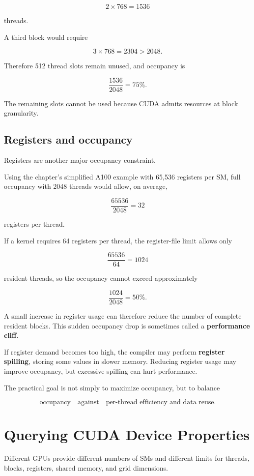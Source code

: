 \documentclass[11pt,a4paper]{article}
\begin{document}
\[
2\times768=1536
\]

threads.

A third block would require

\[
3\times768=2304>2048.
\]

Therefore 512 thread slots remain unused, and occupancy is

\[
\frac{1536}{2048}=75\%.
\]

The remaining slots cannot be used because CUDA admits resources at block granularity.

\subsection{Registers and occupancy}

Registers are another major occupancy constraint.

Using the chapter's simplified A100 example with 65,536 registers per SM, full occupancy with 2048 threads would allow, on average,

\[
\frac{65536}{2048}
=
32
\]

registers per thread.

If a kernel requires 64 registers per thread, the register-file limit allows only

\[
\frac{65536}{64}
=
1024
\]

resident threads, so the occupancy cannot exceed approximately

\[
\frac{1024}{2048}
=
50\%.
\]

A small increase in register usage can therefore reduce the number of complete resident blocks. This sudden occupancy drop is sometimes called a \textbf{performance cliff}.

If register demand becomes too high, the compiler may perform \textbf{register spilling}, storing some values in slower memory. Reducing register usage may improve occupancy, but excessive spilling can hurt performance.

The practical goal is not simply to maximize occupancy, but to balance

\[
\text{occupancy}
\quad\text{against}\quad
\text{per-thread efficiency and data reuse}.
\]

\section{Querying CUDA Device Properties}

Different GPUs provide different numbers of SMs and different limits for threads, blocks, registers, shared memory, and grid dimensions.
\end{document}

